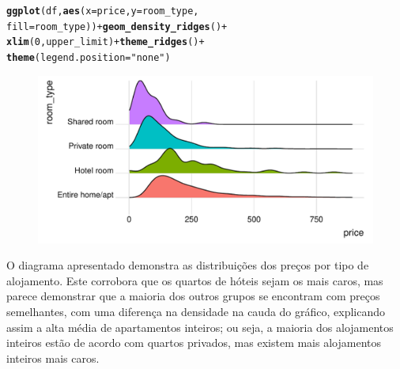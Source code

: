 \documentclass[justified, 11pt]{scrartcl}\usepackage[]{graphicx}\usepackage[]{xcolor}
\makeatletter
\def\maxwidth{ %
  \ifdim\Gin@nat@width>\linewidth
    \linewidth
  \else
    \Gin@nat@width
  \fi
}
\newcommand{\hlnum}[1]{\textcolor[rgb]{0.686,0.059,0.569}{#1}}%
\newcommand{\hlstr}[1]{\textcolor[rgb]{0.192,0.494,0.8}{#1}}%
\newcommand{\hlopt}[1]{\textcolor[rgb]{0,0,0}{#1}}%
\newcommand{\hlstd}[1]{\textcolor[rgb]{0.345,0.345,0.345}{#1}}%
\newcommand{\hlkwc}[1]{\textcolor[rgb]{0.333,0.667,0.333}{#1}}%
\newcommand{\hlkwd}[1]{\textcolor[rgb]{0.737,0.353,0.396}{\textbf{#1}}}%
\newenvironment{kframe}{%
 \def\at@end@of@kframe{}%
 \ifinner\ifhmode%
  \def\at@end@of@kframe{\end{minipage}}%
  \begin{minipage}{\columnwidth}%
 \fi\fi%
 \def\FrameCommand##1{\hskip\@totalleftmargin \hskip-\fboxsep
 \colorbox{shadecolor}{##1}\hskip-\fboxsep
     \hskip-\linewidth \hskip-\@totalleftmargin \hskip\columnwidth}%
 \MakeFramed {\advance\hsize-\width
   \@totalleftmargin\z@ \linewidth\hsize
   \@setminipage}}%
 {\par\unskip\endMakeFramed%
 \at@end@of@kframe}
\newenvironment{knitrout}{}{} %
\makeatother
\begin{document}
\begin{knitrout}
\color{fgcolor}\begin{kframe}
\begin{alltt}
\hlkwd{ggplot}\hlstd{(df,} \hlkwd{aes}\hlstd{(}\hlkwc{x} \hlstd{= price,} \hlkwc{y} \hlstd{= room_type,}
    \hlkwc{fill} \hlstd{= room_type))} \hlopt{+} \hlkwd{geom_density_ridges}\hlstd{()} \hlopt{+}
    \hlkwd{xlim}\hlstd{(}\hlnum{0}\hlstd{, upper_limit)} \hlopt{+} \hlkwd{theme_ridges}\hlstd{()} \hlopt{+}
    \hlkwd{theme}\hlstd{(}\hlkwc{legend.position} \hlstd{=} \hlstr{"none"}\hlstd{)}
\end{alltt}


{\ttfamily\noindent\itshape\color{messagecolor}{\#\# Picking joint bandwidth of 24.6}}\end{kframe}\begin{figure}
\includegraphics[width=\maxwidth]{figure/chunk-RoomTypesPrice-1} \end{figure}

\end{knitrout}

O diagrama apresentado demonstra as distribuições dos preços por tipo de alojamento. Este corrobora que os quartos de hóteis sejam os mais caros, mas parece demonstrar que a maioria dos outros grupos se encontram com preços semelhantes, com uma diferença na densidade na cauda do gráfico, explicando assim a alta média de apartamentos inteiros; ou seja, a maioria dos alojamentos inteiros estão de acordo com quartos privados, mas existem mais alojamentos inteiros mais caros.



{}

\end{document}
